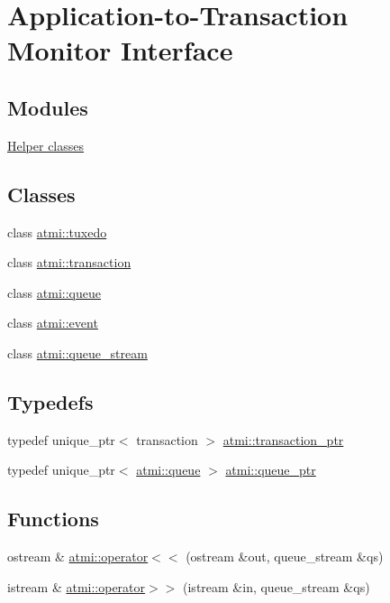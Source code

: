 \hypertarget{group__atmi}{}\section{Application-\/to-\/\+Transaction Monitor Interface}
\label{group__atmi}
\subsection*{Modules}
\begin{DoxyCompactItemize}
\item 
\hyperlink{group__helpers}{Helper classes}
\end{DoxyCompactItemize}
\subsection*{Classes}
\begin{DoxyCompactItemize}
\item 
class \hyperlink{classatmi_1_1tuxedo}{atmi\+::tuxedo}
\item 
class \hyperlink{classatmi_1_1transaction}{atmi\+::transaction}
\item 
class \hyperlink{classatmi_1_1queue}{atmi\+::queue}
\item 
class \hyperlink{classatmi_1_1event}{atmi\+::event}
\item 
class \hyperlink{classatmi_1_1queue__stream}{atmi\+::queue\+\_\+stream}
\end{DoxyCompactItemize}
\subsection*{Typedefs}
\begin{DoxyCompactItemize}
\item 
typedef unique\+\_\+ptr$<$ transaction $>$ \hyperlink{group__atmi_gafc1ae4cdb2829f98c37f27b472fcb867}{atmi\+::transaction\+\_\+ptr}
\item 
typedef unique\+\_\+ptr$<$ \hyperlink{classatmi_1_1queue}{atmi\+::queue} $>$ \hyperlink{group__atmi_gaf8c3e342d908ddc295b73c376b7515ca}{atmi\+::queue\+\_\+ptr}
\end{DoxyCompactItemize}
\subsection*{Functions}
\begin{DoxyCompactItemize}
\item 
ostream \& \hyperlink{group__atmi_gaf3fe9481b5d6e19d1fb56e27baff2154}{atmi\+::operator$<$$<$} (ostream \&out, queue\+\_\+stream \&qs)
\item 
istream \& \hyperlink{group__atmi_gadb0ca17e8de1eecddb5c95b86441ffdc}{atmi\+::operator$>$$>$} (istream \&in, queue\+\_\+stream \&qs)
\end{DoxyCompactItemize}


